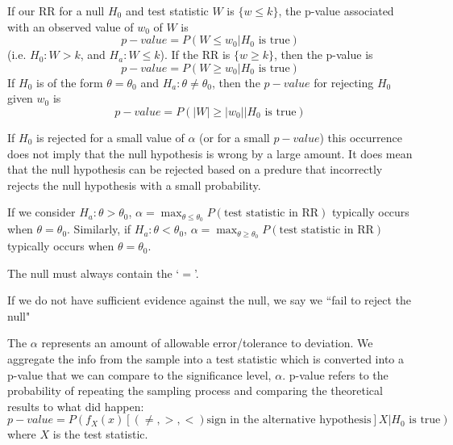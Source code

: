 \documentclass[12pt, a4paper, twoside, openright, titlepage]{book}
\begin{document}
\begin{rmk}{}{}
    If our RR for a null $H_0$ and test statistic $W$ is $\{w \leq k\}$, the p-value associated with an observed value of $w_0$ of $W$ is \begin{equation*}
        p-value = P(W \leq w_0\vert H_0\text{ is true})
    \end{equation*}
    (i.e. $H_0:W > k$, and $H_a: W \leq k$). If the RR is $\{w\geq k\}$, then the p-value is \begin{equation*}
        p-value = P(W\geq w_0\vert H_0 \text{ is true})
    \end{equation*}
    If $H_0$ is of the form $\theta = \theta_0$ and $H_a:\theta \neq \theta_0$, then the $p-value$ for rejecting $H_0$ given $w_0$ is \begin{equation*}
        p-value = P(|W| \geq |w_0|\vert H_0 \text{ is true})
    \end{equation*}
\end{rmk}


\begin{rmk}{}{}
    If $H_0$ is rejected for a small value of $\alpha$ (or for a small $p-value$) this occurrence does not imply that the null hypothesis is wrong by a large amount. It does mean that the null hypothesis can be rejected based on a predure that incorrectly rejects the null hypothesis with a small probability.
\end{rmk}

\begin{rmk}{}{}
    If we consider $H_a:\theta > \theta_0$, $\alpha = \max_{\theta \leq \theta_0}P(\text{test statistic in RR})$ typically occurs when $\theta = \theta_0$. Similarly, if $H_a:\theta < \theta_0$, $\alpha = \max_{\theta \geq \theta_0}P(\text{test statistic in RR})$ typically occurs when $\theta = \theta_0$.
\end{rmk}


\begin{note}{}{}
    The null must always contain the `$=$'.
\end{note}

\begin{rmk}{}{}
    If we do not have sufficient evidence against the null, we say we ``fail to reject the null"
\end{rmk}

\begin{rmk}{}{}
    The  $\alpha$ represents an amount of allowable error/tolerance to deviation. We aggregate the info from the sample into a test statistic which is converted into a p-value that we can compare to the significance level, $\alpha$. p-value refers to the probability of repeating the sampling process and comparing the theoretical results to what did happen: \begin{equation*}
        p-value = P(f_X(x)[(\neq,>,<)\text{sign in the alternative hypothesis}]X\vert H_0\text{ is true})
    \end{equation*}
    where $X$ is the test statistic.
\end{rmk}
\end{document}
